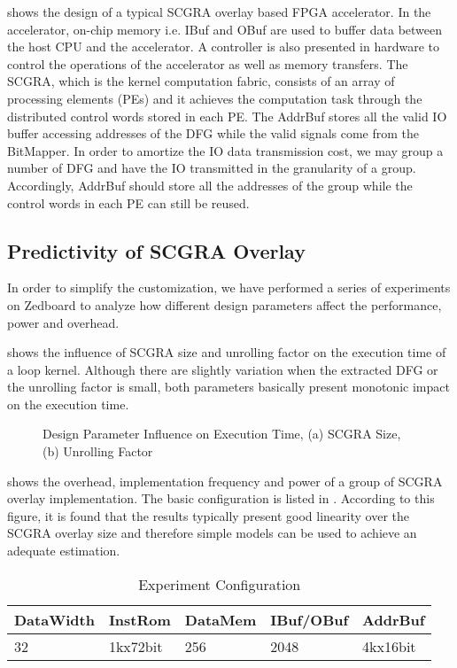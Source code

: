  shows the design of a typical SCGRA overlay 
based FPGA accelerator. In the accelerator, on-chip
memory i.e. IBuf and OBuf are used to buffer data between the host CPU and 
the accelerator. A controller is also presented in hardware 
to control the operations of the accelerator as well as
memory transfers. The SCGRA, which is the kernel computation fabric,
consists of an array of processing elements 
(PEs) and it achieves the computation 
task through the distributed control words stored in each PE. The AddrBuf 
stores all the valid IO buffer accessing addresses of the DFG while 
the valid signals come from the BitMapper. In order 
to amortize the IO data transmission cost, we may group a number of 
DFG and have the IO transmitted in the granularity of a group. Accordingly,
AddrBuf should store all the addresses of the group while the control words 
in each PE can still be reused.

\subsection{Predictivity of SCGRA Overlay}
In order to simplify the customization, we have performed 
a series of experiments on Zedboard \cite{zedboard} to 
analyze how different design parameters affect the 
performance, power and overhead. 

 shows the influence of SCGRA size and 
unrolling factor on the execution time of a loop kernel. Although there 
are slightly variation when the extracted DFG or the unrolling 
factor is small, both parameters basically present monotonic impact on 
the execution time.

\begin{figure}[H]
    \caption{Design Parameter Influence on Execution Time, (a) SCGRA Size, (b) Unrolling
    Factor}
    \label{fig:perf-influence}
  \end{figure}


 shows the overhead, implementation 
frequency and power of a group of SCGRA overlay implementation.
The basic configuration is listed in . According to this 
figure, it is found that the results typically present good 
linearity over the SCGRA overlay size and therefore simple models can be used 
to achieve an adequate estimation.
\begin{table}[H]
  \caption{Experiment Configuration \label{tab:config}}{
  \centering
  \begin{tabular}{l|l|l|l|l}
  \hline
  DataWidth & InstRom & DataMem & IBuf/OBuf & AddrBuf \\ \hline
  32 & 1kx72bit & 256 & 2048 & 4kx16bit\\ \hline
  \end{tabular}
  }
\end{table}

